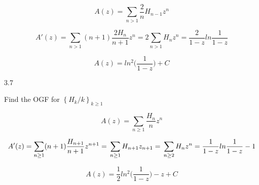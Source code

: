 \documentclass[12pt]{article}
\begin{document}
\begin{equation}
A(z) = \sum_{n > 1}\frac{2}{n}H_{n - 1}z^n \nonumber
\end{equation}

\begin{equation}
    A'(z) = \sum_{n > 1}(n + 1) \frac{2H_n}{n + 1} z^n = 2\sum_{n > 1} H_nz^n = \frac{2}{1 - z}ln\frac{1}{1 - z} \nonumber
\end{equation}

\begin{equation}
    A(z) = ln^2\bigg(\frac{1}{1 - z}\bigg) + C \nonumber
\end{equation}

3.7

Find the OGF for ${ \left\{H_k/k \right\}_{k \geq 1} }$

\begin{equation}
A(z) = \sum_{n \geq 1}\frac{H_n}{n}z^n\nonumber
\end{equation}


\begin{equation}
A'(z) = \sum_{n \geq 1}(n + 1)\frac{H_{n+1}}{n + 1}z^{n + 1} = \\
\sum_{n \geq 1} H_{n + 1}z_{n+1} = \\
\sum_{n \geq 2} H_{n}z^{n} = \frac{1}{1-z}ln\frac{1}{1-z} - 1 \nonumber
\end{equation}

\begin{equation}
A(z) = \frac{1}{2}ln^2\bigg(\frac{1}{1-z} \bigg) - z + C \nonumber
\end{equation}
\end{document}
